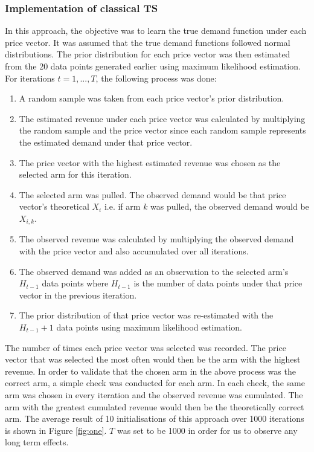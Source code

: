 \documentclass[a4paper]{article}
\begin{document}
\subsubsection{Implementation of classical TS}
In this approach, the objective was to learn the true demand function under each price vector. It was assumed that the true demand functions followed normal distributions. The prior distribution for each price vector was then estimated from the 20 data points generated earlier using maximum likelihood estimation. 
\newline
\newline
For iterations $t = 1,...,T$, the following process was done:
\begin{enumerate}
	\item A random sample was taken from each price vector's prior distribution.
	\item The estimated revenue under each price vector was calculated by multiplying the random sample and the price vector since each random sample represents the estimated demand under that price vector.
	\item The price vector with the highest estimated revenue was chosen as the selected arm for this iteration.
	\item The selected arm was pulled. The observed demand would be that price vector's theoretical $X_i$ i.e. if arm $k$ was pulled, the observed demand would be $X_{i,k}$.
	\item The observed revenue was calculated by multiplying the observed demand with the price vector and also accumulated over all iterations.
	\item The observed demand was added as an observation to the selected arm's $H_{t-1}$ data points where $H_{t-1}$ is the number of data points under that price vector in the previous iteration.
	\item The prior distribution of that price vector was re-estimated with the $H_{t-1} + 1$ data points using maximum likelihood estimation.
\end{enumerate}
The number of times each price vector was selected was recorded. The price vector that was selected the most often would then be the arm with the highest revenue.
\newline
\newline
In order to validate that the chosen arm in the above process was the correct arm, a simple check was conducted for each arm. In each check, the same arm was chosen in every iteration and the observed revenue was cumulated. The arm with the greatest cumulated revenue would then be the theoretically correct arm. The average result of 10 initialisations of this approach over 1000 iterations is shown in Figure \ref{fig:one}. $T$ was set to be 1000 in order for us to observe any long term effects.
\end{document}
